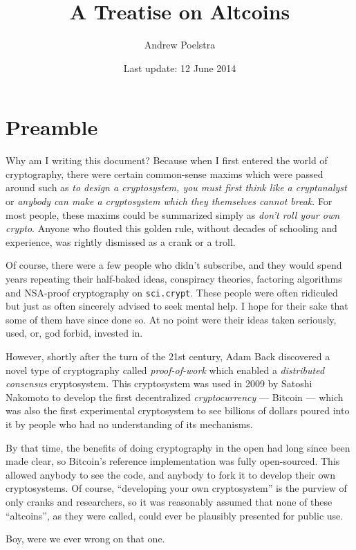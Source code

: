 \documentclass[letterpaper]{article}
\title{A Treatise on Altcoins}
\author{Andrew Poelstra}
\date{Last update: 12 June 2014}
\begin{document}
\maketitle

\section{Preamble}

Why am I writing this document? Because when I first entered the
world of cryptography, there were certain common-sense maxims which
were passed around such as \emph{to design a cryptosystem, you must
first think like a cryptanalyst} or \emph{anybody can make a cryptosystem
which they themselves cannot break}. For most people, these maxims
could be summarized simply as \emph{don't roll your own crypto}. Anyone
who flouted this golden rule, without decades of schooling and experience,
was rightly dismissed as a crank or a troll.

Of course, there were a few people who didn't subscribe, and they would
spend years repeating their half-baked ideas, conspiracy theories, factoring
algorithms and NSA-proof cryptography on \texttt{sci.crypt}. These people
were often ridiculed but just as often sincerely advised to seek mental help.
I hope for their sake that some of them have since done so. At no point were
their ideas taken seriously, used, or, god forbid, invested in.

However, shortly after the turn of the 21st century, Adam Back discovered
a novel type of cryptography called \emph{proof-of-work} which enabled a
\emph{distributed consensus}
cryptosystem. This cryptosystem was used in 2009 by Satoshi Nakomoto to
develop the first decentralized \emph{cryptocurrency} --- Bitcoin --- which
was also the first experimental cryptosystem to see billions of dollars
poured into it by people who had no understanding of its mechanisms.

By that time, the benefits of doing cryptography in the open had long
since been made clear, so Bitcoin's reference implementation was fully
open-sourced. This allowed anybody to see the code, and anybody to fork
it to develop their own cryptosystems. Of course, ``developing your own
cryptosystem'' is the purview of only cranks and researchers, so it was
reasonably assumed that none of these ``altcoins'', as they were called,
could ever be plausibly presented for public use.

Boy, were we ever wrong on that one.
\end{document}
